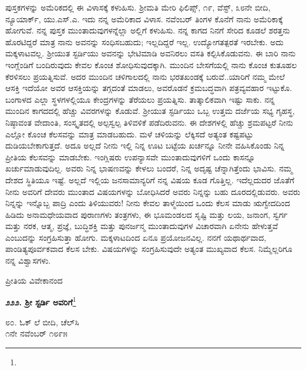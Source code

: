 ಪುಸ್ತಕಗಳನ್ನು ಅಮೆರಿಕದಲ್ಲಿ ಈ ವಿಳಾಸಕ್ಕೆ ಕಳುಹಿಸು. ಶ‍್ರೀಮತಿ ಮೇರಿ ಫಿಲಿಪ್ಸ್, ೧೯, ವೆಸ್ಟ್, ೩೮ನೇ ಬೀದಿ, ನ್ಯೂಯಾರ್ಕ್, ಯು.ಎಸ್.ಎ. ಇದು ನನ್ನ ಅಮೆರಿಕಾದ ವಿಳಾಸ. ನವೆಂಬರ್ ತಿಂಗಳ ಕೊನೆಗೆ ನಾನು ಅಮೆರಿಕಾಕ್ಕೆ ಹೋಗುವೆ. ನನ್ನ ಪುಸ್ತಕ ಮುಂತಾದುವುಗಳನ್ನೆಲ್ಲಾ ಅಲ್ಲಿಗೆ ಕಳುಹಿಸು. ನನ್ನ ಕಾಗದ ನಿನಗೆ ಸೇರಿದ ಕೂಡಲೆ ಶರತ್ತನು ಹೊರಟಿದ್ದರೆ ಮಾತ್ರ ನಾನು ಅವನನ್ನು ಸಂಧಿಸಬಹುದು; ಇಲ್ಲದಿದ್ದರೆ ಇಲ್ಲ. ಉದ್ಯೋಗತತ್ಪರತೆ ಇರಬೇಕು. ಅದು ಮಕ್ಕಳಾಟವಲ್ಲ. ಶ‍್ರೀಯುತ ಸ್ಟರ್ಡಿಯು ಅವನನ್ನು ಭೇಟಿಮಾಡಿ ಅವನಿರಲು ವಸತಿ ಕಲ್ಪಿಸಿಕೊಡುವನು. ಈ ಬಾರಿ ನಾನು ಇಂಗ್ಲೆಂಡಿಗೆ ಬಂದಿರುವುದು ಕೇವಲ ಕೊಂಚ ಶೋಧಿಸುವುದಕ್ಕಾಗಿ. ಮುಂದಿನ ಬೇಸಗೆಯಲ್ಲಿ ನಾನು ಕೊಂಚ ಕುತೂಹಲ ಕೆರಳಿಸಲು ಪ್ರಯತ್ನಿಸುವೆ. ಅದರ ಮುಂದಿನ ಚಳಿಗಾಲದಲ್ಲಿ ನಾನು ಭರತಖಂಡಕ್ಕೆ ಬರುವೆ..ಯಾರಿಗೆ ನಮ್ಮ ಮೇಲೆ ಆಸಕ್ತಿ ಇದೆಯೋ ಅವರ ಆಸಕ್ತಿಯನ್ನು ತಗ್ಗದಂತೆ ಮಾಡಲು, ಅವರೊಡನೆ ಕ್ರಮಬದ್ಧವಾಗಿ ಪತ್ರವ್ಯವಹಾರ ಇಟ್ಟುಕೊ. ಬಂಗಾಳದ ಎಲ್ಲಾ ಸ್ಥಳಗಳಲ್ಲಿಯೂ ಕೇಂದ್ರಗಳನ್ನು ತೆರೆಯಲು ಪ್ರಯತ್ನಿಸು. ತಾತ್ಕಾಲಿಕವಾಗಿ ಇಷ್ಟು ಸಾಕು. ನನ್ನ ಮುಂದಿನ ಕಾಗದದಲ್ಲಿ ಹೆಚ್ಚು ವಿವರಗಳನ್ನು ಕೊಡುವೆ. ಶ‍್ರೀಯುತ ಸ್ಟರ್ಡಿಯು ಒಬ್ಬ ಉತ್ತಮ ದರ್ಜೆಯ ಸಭ್ಯ ಗೃಹಸ್ಥ, ನಿಷ್ಠಾವಂತ ವೇದಾಂತಿ, ಸಂಸ್ಕೃತದಲ್ಲಿ ಅಲ್ಪಸ್ವಲ್ಪ ತಿಳಿವಳಿಕೆ ಪಡೆದಿರುವನು. ಈ ದೇಶಗಳಲ್ಲಿ ಹೆಚ್ಚು ಶ್ರಮಪಟ್ಟರೆ ನೀನು ಎಲ್ಲೋ ಕೊಂಚ ಕೆಲಸವನ್ನು ಮಾತ್ರ ಮಾಡಬಹುದು. ಮಳೆ ಚಳಿಯನ್ನು ಲೆಕ್ಕಿಸದೆ ಅತ್ಯಂತ ಕಷ್ಟಪಟ್ಟು ದುಡಿಯಬೇಕಾಗುತ್ತದೆ. ಅದೂ ಅಲ್ಲದೆ ನೀನು ಇಲ್ಲಿ ನಿನ್ನ ಊಟ ಬಟ್ಟೆಯ ಖರ್ಚನ್ನೂ ನೀನೇ ವಹಿಸಿಕೊಂಡು ನಿನ್ನ ಪ್ರೀತಿಯ ಕೆಲಸವನ್ನು ಮಾಡಬೇಕು. ಇಂಗ್ಲಿಷರು ಉಪನ್ಯಾಸವೇ ಮುಂತಾದುವುಗಳಿಗೆ ಒಂದು ಕಾಸನ್ನೂ ಖರ್ಚುಮಾಡುವುದಿಲ್ಲ. ಅವರು ನಿನ್ನ ಭಾಷಣವನ್ನು ಕೇಳಲು ಬಂದರೆ, ನಿನ್ನ ಅದೃಷ್ಟ ಚೆನ್ನಾಗಿತ್ತೆಂದು ಭಾವಿಸು. ನಮ್ಮ ದೇಶದ ಸ್ಥಿತಿಯೂ ಇಷ್ಟೆ. ಅಲ್ಲದೆ ಇಲ್ಲಿಯ ಜನಸಾಮಾನ್ಯರಿಗೆ ನನ್ನ ವಿಷಯ ಕೂಡ ಗೊತ್ತಿಲ್ಲ. ಇದೆಲ್ಲದುದರ ಜೊತೆಗೆ ನೀನು ಅವರಿಗೆ ದೇವರು ಮುಂತಾದ ವಿಷಯಗಳನ್ನು ಬೋಧಿಸಿದರೆ ಅವರು ನಿನ್ನನ್ನು ಬಹು ದೂರದಲ್ಲಿಡುವರು. ಅವರು ನಿನ್ನನ್ನು ಇನ್ನೊಬ್ಬ ಪಾದ್ರಿ ಎಂದು ತಿಳಿಯುವರು! ನೀನು ಕೇವಲ ತಾಳ್ಮೆಯಿಂದ ಒಂದು ಕೆಲಸ ಮಾಡು\enginline{-} ಋಗ್ವೇದದಿಂದ ಹಿಡಿದು ಅನಾಮಧೇಯವಾದ ಪುರಾಣಗಳು ತಂತ್ರಗಳು, ಈ ಭೂಮಂಡಲದ ಸೃಷ್ಟಿ ಮತ್ತು ಲಯ, ಜನಾಂಗ, ಸ್ವರ್ಗ ಮತ್ತು ನರಕ, ಆತ್ಮ, ಪ್ರಜ್ಞೆ, ಬುದ್ಧಿಶಕ್ತಿ ಮತ್ತು ಪುನರ್ಜನ್ಮ ಮುಂತಾದುವುಗಳ ವಿಚಾರವಾಗಿ ಏನೇನು ಹೇಳುತ್ತವೆ ಎಂಬುದನ್ನು ಸಂಗ್ರಹಿಸುತ್ತಾ ಹೋಗು. ಮಕ್ಕಳಾಟದಿಂದ ಏನೂ ಪ್ರಯೋಜನವಿಲ್ಲ. ನನಗೆ ಯಥಾರ್ಥವಾದ, ಪಾಂಡಿತ್ಯಪೂರ್ವಕವಾದ ಕೆಲಸ ಬೇಕು. ವಿಷಯಗಳನ್ನು ಸಂಗ್ರಹಿಸುವುದೇ ಅತ್ಯಂತ ಮುಖ್ಯವಾದ ಕೆಲಸ. ನಿಮ್ಮೆಲ್ಲರಿಗೂ ನನ್ನ ವಿಶ್ವಾಸಗಳು.

\vspace{-0.5cm}

{\flushright
ಪ್ರೀತಿಯ ವಿವೇಕಾನಂದ\par}

\begin{center}
\textbf{೨೨೨. ಶ‍್ರೀ ಸ್ಟರ್ಡಿ ಅವರಿಗೆ}\footnote{}
\end{center}

\vspace{-0.5cm}

\begin{flushright}
೮೦. ಓಕ್ ಲೆ ಬೀದಿ, ಚೆಲ್‌ಸಿ\\೧ನೇ ನವೆಂಬರ್ ೧೮೯೫
\end{flushright}

